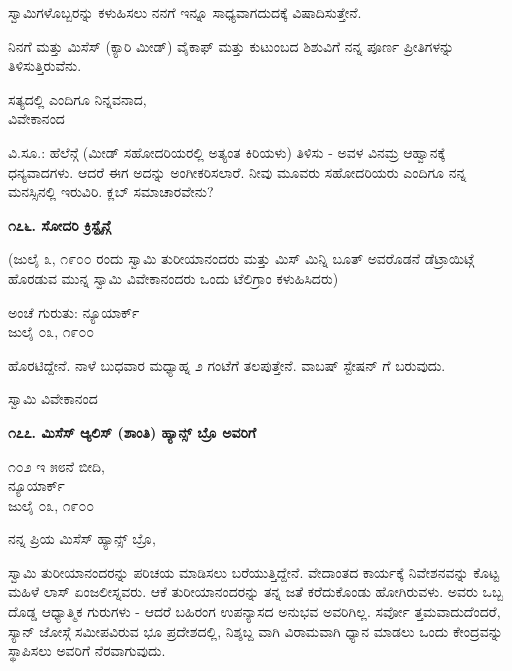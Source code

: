 ಸ್ವಾಮಿಗಳೊಬ್ಬರನ್ನು ಕಳುಹಿಸಲು ನನಗೆ ಇನ್ನೂ ಸಾಧ್ಯವಾಗದುದಕ್ಕೆ ವಿಷಾದಿಸುತ್ತೇನೆ.

ನಿನಗೆ ಮತ್ತು ಮಿಸೆಸ್ (ಕ್ಯಾರಿ ಮೀಡ್) ವೈಕಾಫ್ ಮತ್ತು ಕುಟುಂಬದ ಶಿಶುವಿಗೆ ನನ್ನ ಪೂರ್ಣ ಪ್ರೀತಿಗಳನ್ನು ತಿಳಿಸುತ್ತಿರುವೆನು.

\begin{flushright}
ಸತ್ಯದಲ್ಲಿ ಎಂದಿಗೂ ನಿನ್ನವನಾದ,\\ವಿವೇಕಾನಂದ
\end{flushright}

ವಿ.ಸೂ.: ಹೆಲೆನ್ಗೆ (ಮೀಡ್ ಸಹೋದರಿಯರಲ್ಲಿ ಅತ್ಯಂತ ಕಿರಿಯಳು) ತಿಳಿಸು - ಅವಳ ವಿನಮ್ರ ಆಹ್ವಾನಕ್ಕೆ ಧನ್ಯವಾದಗಳು. ಆದರೆ ಈಗ ಅದನ್ನು ಅಂಗೀಕರಿಸಲಾರೆ. ನೀವು ಮೂವರು ಸಹೋದರಿಯರು ಎಂದಿಗೂ ನನ್ನ ಮನಸ್ಸಿನಲ್ಲಿ ಇರುವಿರಿ. ಕ್ಲಬ್ ಸಮಾಚಾರವೇನು?

\begin{center}
\textbf{೧೭೬. ಸೋದರಿ ಕ್ರಿಸ್ಟೈನ್ಗೆ}
\end{center}

(ಜುಲೈ ೩, ೧೯೦೦ ರಂದು ಸ್ವಾಮಿ ತುರೀಯಾನಂದರು ಮತ್ತು ಮಿಸ್ ಮಿನ್ನಿ ಬೂತ್ ಅವರೊಡನೆ ಡೆಟ್ರಾಯಿಟ್ಗೆ ಹೊರಡುವ ಮುನ್ನ ಸ್ವಾಮಿ ವಿವೇಕಾನಂದರು ಒಂದು ಟೆಲಿಗ್ರಾಂ ಕಳುಹಿಸಿದರು)

\begin{flushright}
ಅಂಚೆ ಗುರುತು: ನ್ಯೂಯಾರ್ಕ್\\ಜುಲೈ ೦೩, ೧೯೦೦
\end{flushright}

ಹೊರಟಿದ್ದೇನೆ. ನಾಳೆ ಬುಧವಾರ ಮಧ್ಯಾಹ್ನ ೨ ಗಂಟೆಗೆ ತಲಪುತ್ತೇನೆ. ವಾಬಷ್ ಸ್ಟೇಷನ್ ಗೆ ಬರುವುದು.

\begin{flushright}
ಸ್ವಾಮಿ ವಿವೇಕಾನಂದ
\end{flushright}

\begin{center}
\textbf{೧೭೭. ಮಿಸೆಸ್ ಆ್ಯಲಿಸ್ (ಶಾಂತಿ) ಹ್ಯಾನ್ಸ್ ಬ್ರೊ ಅವರಿಗೆ}
\end{center}

\begin{flushright}
೧೦೨ ಇ ೫೮ನೆ ಬೀದಿ,\\ನ್ಯೂಯಾರ್ಕ್\\ಜುಲೈ ೦೩, ೧೯೦೦
\end{flushright}

ನನ್ನ ಪ್ರಿಯ ಮಿಸೆಸ್ ಹ್ಯಾನ್ಸ್ ಬ್ರೊ,

ಸ್ವಾಮಿ ತುರೀಯಾನಂದರನ್ನು ಪರಿಚಯ ಮಾಡಿಸಲು ಬರೆಯುತ್ತಿದ್ದೇನೆ. ವೇದಾಂತದ ಕಾರ್ಯಕ್ಕೆ ನಿವೇಶನವನ್ನು ಕೊಟ್ಟ ಮಹಿಳೆ ಲಾಸ್ ಏಂಜಲೀಸ್ನವರು. ಆಕೆ ತುರೀಯಾನಂದರನ್ನು ತನ್ನ ಜತೆ ಕರೆದುಕೊಂಡು ಹೋಗಿರುವಳು. ಅವರು ಒಬ್ಬ ದೊಡ್ಡ ಆಧ್ಯಾತ್ಮಿಕ ಗುರುಗಳು - ಆದರೆ ಬಹಿರಂಗ ಉಪನ್ಯಾಸದ ಅನುಭವ ಅವರಿಗಿಲ್ಲ. ಸರ್ವೋ ತ್ತಮವಾದುದೆಂದರೆ, ಸ್ಯಾನ್ ಜೋಸ್ಗೆ ಸಮೀಪವಿರುವ ಭೂ ಪ್ರದೇಶದಲ್ಲಿ, ನಿಶ್ಶಬ್ದ ವಾಗಿ ವಿರಾಮವಾಗಿ ಧ್ಯಾನ ಮಾಡಲು ಒಂದು ಕೇಂದ್ರವನ್ನು ಸ್ಥಾಪಿಸಲು ಅವರಿಗೆ ನೆರವಾಗುವುದು.

